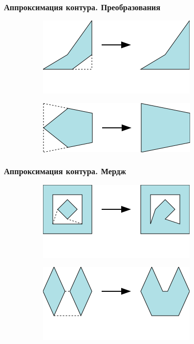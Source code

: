\documentclass[10pt, unicode]{beamer}
\begin{document}
    \begin{frame}
        \frametitle{Аппроксимация контура. Преобразования}
        \begin{figure}[H]
            \begin{subfigure}[t]{\linewidth}
                \centering
                \includegraphics[scale=0.8]{images/bendneighbor2.png}
            \end{subfigure}
            \begin{subfigure}[t]{\linewidth}
                \centering
                \includegraphics[scale=0.8]{images/bendoutboth.png}
            \end{subfigure}
        \end{figure}
    \end{frame}
    \begin{frame}
        \frametitle{Аппроксимация контура. Мердж}
        \begin{figure}[H]
            \centering
            \begin{subfigure}[t]{\linewidth}
                \centering
                \includegraphics[scale=0.8]{images/polygonmerge.png}
            \end{subfigure}
            \begin{subfigure}[t]{\linewidth}
                \centering
                \includegraphics[scale=0.8]{images/polygonmerge2.png}
            \end{subfigure}
        \end{figure}
    \end{frame}
\end{document}
